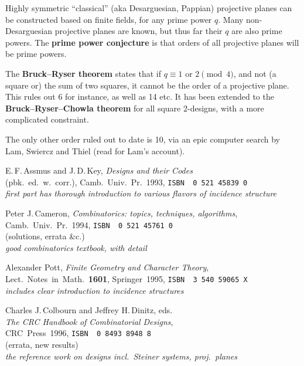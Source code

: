\documentclass[12pt]{article}
\def\bitem#1{\bibitem[#1]{#1}}
\def\name#1{{\sc #1}}
\def\book#1{{\sl #1\/}}
\def\vol#1{{\bf #1}}
\def\isbn#1{{\small\tt ISBN\,\,#1}}
\begin{document}
Highly symmetric ``classical'' (aka Desarguesian, Pappian) projective planes can be constructed based on finite fields, for any prime power $q$. Many non-Desarguesian projective planes are known, but thus far their $q$ are also prime powers. The {\bf prime power conjecture} is that orders of all projective planes will be prime powers.

The {\bf Bruck--Ryser theorem} states that if $q\equiv1$ or $2\pmod 4$, and not (a square or) the sum of two squares, it cannot be the order of a projective plane. This rules out 6 for instance, as well as 14 etc. It has been extended
to the {\bf Bruck--Ryser--Chowla theorem} for all square 2-designs, with a more complicated constraint.

The only other order ruled out to date is 10, via an epic computer search by Lam, Swiercz and Thiel (read
{\tt{}} for Lam's account).

\vfill\pagebreak %
\raggedright
\begin{thebibliography}{MST73}

\bitem{AK93}  \name{E.\,F.\,Assmus} and \name{J.\,D.\,Key},
              \book{Designs and their Codes}\\
              (pbk.~ed.~w.~corr.), Camb.~Univ.~Pr.~1993,
              \isbn{0\,521\,45839\,0}\\
              {\em first part has thorough introduction to
               various flavors of incidence structure}

\bitem{Cam94} \name{Peter J.\,Cameron},
              \book{Combinatorics: topics, techniques, algorithms},\\
              Camb.~Univ.~Pr.~1994, \isbn{0\,521\,45761\,0}\\
{\tt{}} 
              (solutions, errata \&c.)\\
              {\em good combinatorics textbook, with detail}

\bitem{Pot95} \name{Alexander Pott},
              \book{Finite Geometry and Character Theory},\\
              Lect.~Notes~in~Math.~\vol{1601}, Springer~1995,
              \isbn{3\,540\,59065\,X}\\
              {\em includes clear introduction to incidence
               structures}

\bitem{CD96}  \name{Charles J.\,Colbourn} and \name{Jeffrey H.\,Dinitz}, eds.\\
              \book{The CRC Handbook of Combinatorial Designs},\\
              CRC~Press~1996, \isbn{0\,8493\,8948\,8}\\
{\tt{}} (errata, new results)\\
              {\em the reference work on designs incl.\ Steiner systems,
               proj.~planes}


\end{thebibliography}
\end{document}
